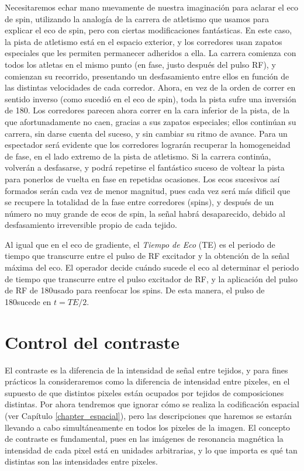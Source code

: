 Necesitaremos echar mano nuevamente de nuestra imaginación para aclarar el eco de spin, utilizando la analogía de la carrera de atletismo que usamos para explicar el eco de spin, pero con ciertas modificaciones fantásticas. En este caso, la pista de atletismo está en el espacio exterior, y los corredores usan zapatos especiales que les permiten permanecer adheridos a ella. La carrera comienza con todos los atletas en el mismo punto (en fase, justo después del pulso RF), y comienzan su recorrido, presentando un desfasamiento entre ellos en función de las distintas velocidades de cada corredor. Ahora, en vez de la orden de correr en sentido inverso (como sucedió en el eco de spin), toda la pista sufre una inversión de 180\degrees. Los corredores parecen ahora correr en la cara inferior de la pista, de la que afortunadamente no caen, gracias a sus zapatos especiales; ellos continúan su carrera, sin darse cuenta del suceso, y sin cambiar su ritmo de avance. Para un espectador será evidente que los corredores lograrán recuperar la homogeneidad de fase, en el lado extremo de la pista de atletismo. Si la carrera continúa, volverán a desfasarse, y podrá repetirse el fantástico suceso de voltear la pista para ponerlos de vuelta en fase en repetidas ocasiones. Los ecos sucesivos así formados serán cada vez de menor magnitud, pues cada vez será más dificil que se recupere la totalidad de la fase entre corredores (spins), y después de un número no muy grande de ecos de spin, la señal habrá desaparecido, debido al desfasamiento irreversible propio de cada tejido.

Al igual que en el eco de gradiente, el \textit{Tiempo de Eco} (TE)  es el periodo de tiempo que transcurre entre el pulso de RF excitador y la obtención de la señal máxima del eco. El operador decide cuándo sucede el eco al determinar el periodo de tiempo que transcurre entre el pulso excitador de RF, y la aplicación del pulso de RF de 180\degrees usado para reenfocar los spins. De esta manera, el pulso de 180\degrees sucede en $t=TE/2$. 



\section{Control del contraste}
El contraste es la diferencia de la intensidad de señal entre tejidos, y para fines prácticos la consideraremos como la diferencia de intensidad entre pixeles, en el supuesto de que distintos pixeles están ocupados por tejidos de composiciones distintas. Por ahora tendremos que ignorar cómo se realiza la codificación espacial (ver Capítulo \ref{chapter_espacial}), pero las descripciones que haremos se estarán llevando a cabo simultáneamente en todos los pixeles de la imagen. El concepto de contraste es fundamental, pues en las imágenes de resonancia magnética la intensidad de cada pixel está en unidades arbitrarias, y lo que importa es qué tan distintas son las intensidades entre pixeles.

